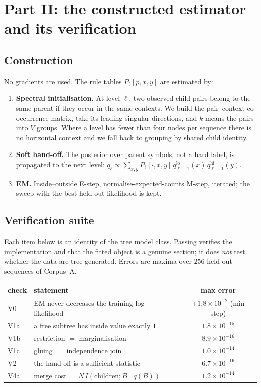 \section{Part II: the constructed estimator and its verification}
\label{sec:hier-estimator}

\subsection{Construction}

No gradients are used. The rule tables $P_\ell[p,x,y]$ are estimated by:

\begin{enumerate}
\item \textbf{Spectral initialisation.} At level $\ell$, two observed child
pairs belong to the same parent if they occur in the same contexts. We build
the pair--context co-occurrence matrix, take its leading singular directions,
and $k$-means the pairs into $V$ groups. Where a level has fewer than four
nodes per sequence there is no horizontal context and we fall back to grouping
by shared child identity.

\item \textbf{Soft hand-off.} The posterior over parent symbols, not a hard
label, is propagated to the next level:
$q_\ell \propto \sum_{x,y} P_\ell[\cdot,x,y]\, q_{\ell-1}^{\mathrm{lo}}(x)\,
q_{\ell-1}^{\mathrm{hi}}(y)$.

\item \textbf{EM.} Inside--outside E-step, normalise-expected-counts M-step,
iterated; the sweep with the best held-out likelihood is kept.
\end{enumerate}

\subsection{Verification suite}

Each item below is an identity of the tree model class. Passing verifies the
implementation and that the fitted object is a genuine section; it does
\emph{not} test whether the data are tree-generated. Errors are maxima over
$256$ held-out sequences of Corpus~A.

\begin{center}
\begin{tabular}{llc}
\toprule
check & statement & max error \\
\midrule
V0 & EM never decreases the training log-likelihood & $+1.8\times10^{-2}$ (min step) \\
V1a & a free subtree has inside value exactly $1$ & $1.8\times10^{-15}$ \\
V1b & restriction $=$ marginalisation & $8.9\times10^{-16}$ \\
V1c & gluing $=$ independence join & $1.0\times10^{-14}$ \\
V2 & the hand-off is a sufficient statistic & $6.7\times10^{-16}$ \\
V4a & merge cost $= N\,I(\text{children};B \mid q(B))$ & $1.2\times10^{-14}$ \\
\bottomrule
\end{tabular}
\end{center}

